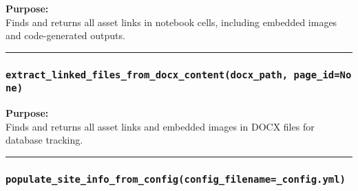 \textbf{Purpose:}\\
Finds and returns all asset links in notebook cells, including embedded
images and code-generated outputs.

\begin{center}\rule{0.5\linewidth}{0.5pt}\end{center}

\subsubsection{\texorpdfstring{\texttt{extract\_linked\_files\_from\_docx\_content(docx\_path,\ page\_id=None)}}{extract\_linked\_files\_from\_docx\_content(docx\_path, page\_id=None)}}\label{extract_linked_files_from_docx_contentdocx_path-page_idnone}

\begin{Shaded}
\begin{Highlighting}[]
\OperatorTok{=}\NormalTok{):}
\end{Highlighting}
\end{Shaded}

\textbf{Purpose:}\\
Finds and returns all asset links and embedded images in DOCX files for
database tracking.

\begin{center}\rule{0.5\linewidth}{0.5pt}\end{center}

\subsubsection{\texorpdfstring{\texttt{populate\_site\_info\_from\_config(config\_filename=\textquotesingle{}\_config.yml\textquotesingle{})}}{populate\_site\_info\_from\_config(config\_filename=\textquotesingle\_config.yml\textquotesingle)}}\label{populate_site_info_from_configconfig_filename_config.yml}

\begin{Shaded}
\begin{Highlighting}[]
\OperatorTok{=}\NormalTok{):}
\end{Highlighting}
\end{Shaded}

